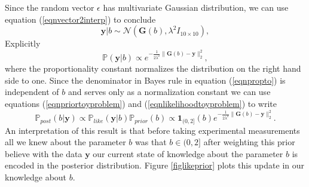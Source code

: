 \documentclass[12pt]{book}
\newcommand{\post}{\mathbb{P}_{post}}
\newcommand{\like}{\mathbb{P}_{like}}
\newcommand{\prior}{\mathbb{P}_{prior}}
\newcommand{\p}{\mathbb{P}}
\newcommand{\y}{\textbf{y}}
\begin{document}
Since the random vector $\epsilon$ has multivariate Gaussian distribution, we can use equation (\ref{eqnvector2interp})
to conclude \cite{Somersalo}
\begin{equation*}
\textbf{y}|b\sim \mathcal{N}(\textbf{G}(b),\lambda^{2} I_{10\times 10}),
\end{equation*}
Explicitly
\begin{equation}\label{eqnlikelihoodtoyproblem}
\p(\textbf{y}|b)\propto e^{-\frac{1}{2\lambda^{2}}\|\textbf{G}(b)-\textbf{y}\|_{2}^{2}},
\end{equation}
where the proportionality constant normalizes the distribution on the right hand side to one. Since
the denominator in Bayes rule in equation (\ref{eqnpropto}) is independent of $b$ and serves only 
as a normalization constant we can use equations (\ref{eqnpriortoyproblem}) and (\ref{eqnlikelihoodtoyproblem})  
to write 
\begin{equation}\label{eqnposteriorforb}
\post(b|\y)\propto\like(\y|b)\prior(b)\propto \textbf{1}_{(0,2]}(b)e^{-\frac{1}{2\lambda^{2}}\|\textbf{G}(b)-\textbf{y}\|_{2}^{2}}.
\end{equation}
An interpretation of this result is that before taking experimental measurements all we knew about the parameter $b$ was
that $b\in (0,2]$ after weighting this prior believe with the data $\y$ our current state of knowledge about the
parameter $b$ is encoded in the posterior distribution. Figure \ref{figlikeprior} plots this update in our knowledge about $b$.
\end{document}
